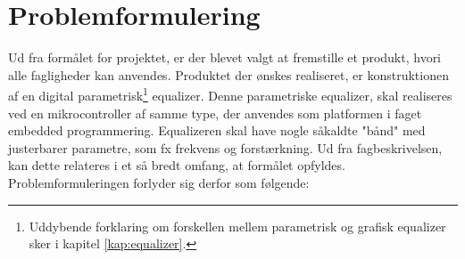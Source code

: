\section{Problemformulering}
%
%


%
Ud fra formålet for projektet, er der blevet valgt at fremstille et produkt, hvori alle fagligheder kan anvendes. 
Produktet der ønskes realiseret, er konstruktionen af en digital parametrisk\footnote{Uddybende forklaring om forskellen mellem parametrisk og grafisk equalizer sker i kapitel \ref{kap:equalizer}.} equalizer. 
Denne parametriske equalizer, skal realiseres ved en mikrocontroller af samme type, der anvendes som platformen i faget embedded programmering.
Equalizeren skal have nogle såkaldte "bånd" med justerbarer parametre, som fx frekvens og forstærkning. 
Ud fra fagbeskrivelsen, kan dette relateres i et så bredt omfang, at formålet opfyldes. 
Problemformuleringen forlyder sig derfor som følgende: \\

